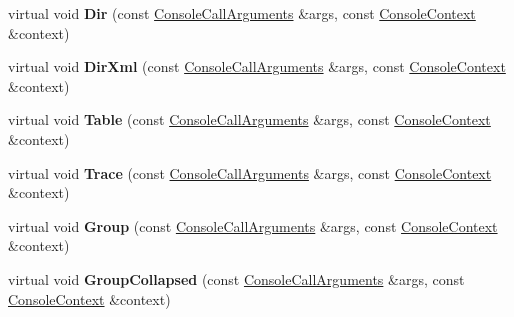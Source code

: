 \begin{DoxyCompactItemize}
virtual void {\bfseries Dir} (const \mbox{\hyperlink{classv8_1_1debug_1_1ConsoleCallArguments}{Console\+Call\+Arguments}} \&args, const \mbox{\hyperlink{classv8_1_1debug_1_1ConsoleContext}{Console\+Context}} \&context)
\item 
\mbox{\label{classv8_1_1debug_1_1ConsoleDelegate_a82a80df0adb132785e397473e8543c75}} 
virtual void {\bfseries Dir\+Xml} (const \mbox{\hyperlink{classv8_1_1debug_1_1ConsoleCallArguments}{Console\+Call\+Arguments}} \&args, const \mbox{\hyperlink{classv8_1_1debug_1_1ConsoleContext}{Console\+Context}} \&context)
\item 
\mbox{\label{classv8_1_1debug_1_1ConsoleDelegate_a93ae4d560d518f566d487aa7dc8ee3ce}} 
virtual void {\bfseries Table} (const \mbox{\hyperlink{classv8_1_1debug_1_1ConsoleCallArguments}{Console\+Call\+Arguments}} \&args, const \mbox{\hyperlink{classv8_1_1debug_1_1ConsoleContext}{Console\+Context}} \&context)
\item 
\mbox{\label{classv8_1_1debug_1_1ConsoleDelegate_abbf52921ae7f368ed621209a044d5244}} 
virtual void {\bfseries Trace} (const \mbox{\hyperlink{classv8_1_1debug_1_1ConsoleCallArguments}{Console\+Call\+Arguments}} \&args, const \mbox{\hyperlink{classv8_1_1debug_1_1ConsoleContext}{Console\+Context}} \&context)
\item 
\mbox{\label{classv8_1_1debug_1_1ConsoleDelegate_a674d77503ad862128344cbd82898a083}} 
virtual void {\bfseries Group} (const \mbox{\hyperlink{classv8_1_1debug_1_1ConsoleCallArguments}{Console\+Call\+Arguments}} \&args, const \mbox{\hyperlink{classv8_1_1debug_1_1ConsoleContext}{Console\+Context}} \&context)
\item 
\mbox{\label{classv8_1_1debug_1_1ConsoleDelegate_a2fd188944770d914b89255e6a6971ba9}} 
virtual void {\bfseries Group\+Collapsed} (const \mbox{\hyperlink{classv8_1_1debug_1_1ConsoleCallArguments}{Console\+Call\+Arguments}} \&args, const \mbox{\hyperlink{classv8_1_1debug_1_1ConsoleContext}{Console\+Context}} \&context)
\item 
\mbox{\label{classv8_1_1debug_1_1ConsoleDelegate_ac1e27ca0e8eed64fbecbac4b6982ad6f}} 

\end{DoxyCompactItemize}
